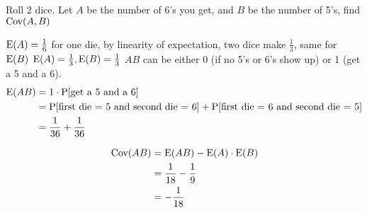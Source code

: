 \question Roll 2 dice. Let $A$ be the number of 6's you get, and $B$ 
be the number of 5's, find $\text{Cov}(A, B)$
\begin{solution}[7cm]
$\text{E}(A) = \frac{1}{6}$ for one die, by linearity of expectation, two dice 
make $\frac{1}{3}$, same for $\text{E}(B)$
$\text{E}(A) = \frac{1}{3}, \text{E}(B) = \frac{1}{3}$ \newline
$AB$ can be either 0 (if no 5's or 6's show up) or 1 (get a 5 and a 6).
\begin{equation}
\begin{split}
\text{E}(AB) &= 1 \cdot \text{P}[\text{get a 5 and a 6}] \\ \nonumber
 &= \text{P}[\text{first die = 5 and second die = 6}] + \text{P}[\text{first die = 
 6 and second die = 5}]  \\ 
 &= \frac{1}{36} + \frac{1}{36}
\end{split}
\end{equation} 

 
\begin{equation}
\begin{split}
\text{Cov} (AB) &=  \text{E}(AB) - \text{E}(A) \cdot  \text{E}(B) \\ \nonumber
&= \frac{1}{18} - \frac{1}{9} \\
&= -\frac{1}{18}
\end{split}
\end{equation}
\end{solution}